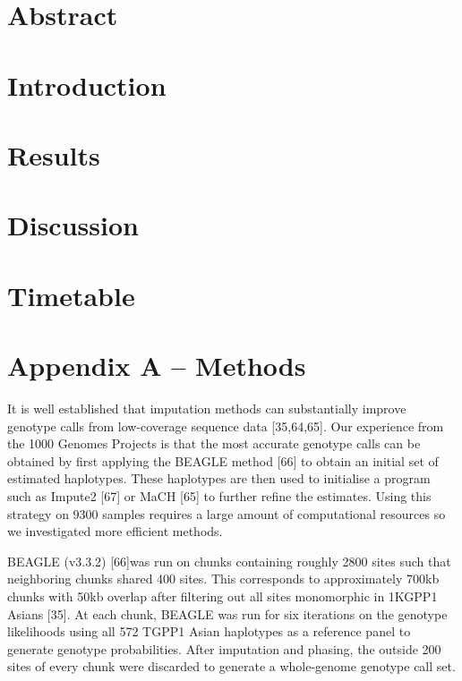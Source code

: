 \documentclass[nobib,a4paper]{tufte-handout}
\begin{document}

\section{Abstract}

\section{Introduction}

\section{Results}

\section{Discussion}

\section{Timetable}

\section{Appendix A -- Methods}

It is well established that imputation methods can substantially
improve genotype calls from low-coverage sequence data [35,64,65]. Our
experience from the 1000 Genomes Projects is that the most accurate
genotype calls can be obtained by first applying the BEAGLE method
[66] to obtain an initial set of estimated haplotypes. These
haplotypes are then used to initialise a program such as Impute2 [67]
or MaCH [65] to further refine the estimates. Using this strategy on
9300 samples requires a large amount of computational resources so we
investigated more efficient methods. 

BEAGLE (v3.3.2) [66]was run on chunks containing roughly 2800 sites
such that neighboring chunks shared 400 sites. This corresponds to
approximately 700kb chunks with 50kb overlap after filtering out all
sites monomorphic in 1KGPP1 Asians [35].  At each chunk, BEAGLE was
run for six iterations on the genotype likelihoods using all 572 TGPP1
Asian haplotypes as a reference panel to generate genotype
probabilities. After imputation and phasing, the outside 200 sites of
every chunk were discarded to generate a whole-genome genotype call
set.
\end{document}
